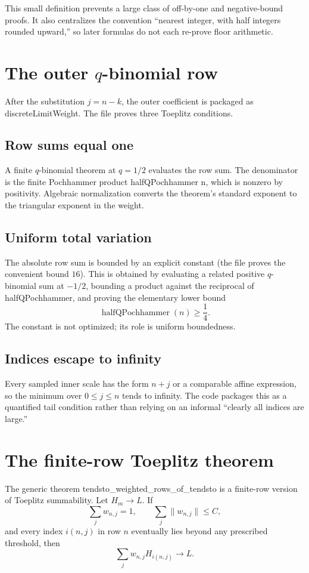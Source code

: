 \documentclass[11pt,a4paper,openany]{book}
\def\decl#1{#1}
\newcommand{\decl}[1]{\texttt{\detokenize{#1}}}
\begin{document}
\begin{engineering}
This small definition prevents a large class of off-by-one and negative-bound
proofs.  It also centralizes the convention “nearest integer, with half
integers rounded upward,” so later formulas do not each re-prove floor
arithmetic.
\end{engineering}

\section{The outer \texorpdfstring{$q$-binomial}{q-binomial} row}
After the substitution $j=n-k$, the outer coefficient is packaged as
\decl{discreteLimitWeight}.  The file proves three Toeplitz conditions.

\subsection{Row sums equal one}
A finite $q$-binomial theorem at $q=1/2$ evaluates the row sum.  The denominator
is the finite Pochhammer product \decl{halfQPochhammer n}, which is nonzero by
positivity.  Algebraic normalization converts the theorem's standard exponent
to the triangular exponent in the weight.

\subsection{Uniform total variation}
The absolute row sum is bounded by an explicit constant (the file proves the
convenient bound $16$).  This is obtained by evaluating a related positive
$q$-binomial sum at $-1/2$, bounding a product against the reciprocal of
\decl{halfQPochhammer}, and proving the elementary lower bound
\[
 \operatorname{halfQPochhammer}(n)\ge\frac14.
\]
The constant is not optimized; its role is uniform boundedness.

\subsection{Indices escape to infinity}
Every sampled inner scale has the form $n+j$ or a comparable affine expression,
so the minimum over $0\le j\le n$ tends to infinity.  The code packages this as
a quantified tail condition rather than relying on an informal “clearly all
indices are large.”

\section{The finite-row Toeplitz theorem}
The generic theorem \decl{tendsto_weighted_rows_of_tendsto} is a finite-row
version of Toeplitz summability.  Let $H_m\to L$.  If
\[
 \sum_j w_{n,j}=1,
 \qquad \sum_j\|w_{n,j}\|\le C,
\]
and every index $i(n,j)$ in row $n$ eventually lies beyond any prescribed
threshold, then
\[
 \sum_j w_{n,j}H_{i(n,j)}\longrightarrow L.
\]
\end{document}
